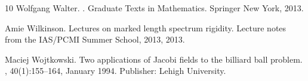 \documentclass[reqno,11pt]{amsart}
\begin{document}
\begin{thebibliography}{10}
Wolfgang Walter.
.
\newblock Graduate Texts in Mathematics. Springer New York, 2013.

Amie Wilkinson.
\newblock Lectures on marked length spectrum rigidity.
\newblock Lecture notes from the IAS/PCMI Summer School, 2013, 2013.

Maciej Wojtkowski.
\newblock Two applications of {Jacobi} fields to the billiard ball problem.
, 40(1):155--164, January 1994.
\newblock Publisher: Lehigh University.

\end{thebibliography}
\end{document}
